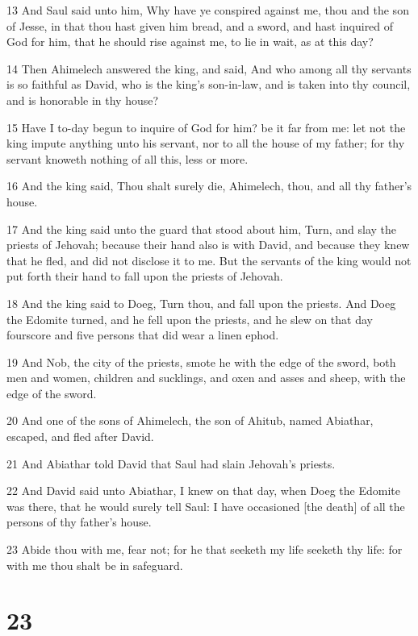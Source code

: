 \par 13 And Saul said unto him, Why have ye conspired against me, thou and the son of Jesse, in that thou hast given him bread, and a sword, and hast inquired of God for him, that he should rise against me, to lie in wait, as at this day?
\par 14 Then Ahimelech answered the king, and said, And who among all thy servants is so faithful as David, who is the king's son-in-law, and is taken into thy council, and is honorable in thy house?
\par 15 Have I to-day begun to inquire of God for him? be it far from me: let not the king impute anything unto his servant, nor to all the house of my father; for thy servant knoweth nothing of all this, less or more.
\par 16 And the king said, Thou shalt surely die, Ahimelech, thou, and all thy father's house.
\par 17 And the king said unto the guard that stood about him, Turn, and slay the priests of Jehovah; because their hand also is with David, and because they knew that he fled, and did not disclose it to me. But the servants of the king would not put forth their hand to fall upon the priests of Jehovah.
\par 18 And the king said to Doeg, Turn thou, and fall upon the priests. And Doeg the Edomite turned, and he fell upon the priests, and he slew on that day fourscore and five persons that did wear a linen ephod.
\par 19 And Nob, the city of the priests, smote he with the edge of the sword, both men and women, children and sucklings, and oxen and asses and sheep, with the edge of the sword.
\par 20 And one of the sons of Ahimelech, the son of Ahitub, named Abiathar, escaped, and fled after David.
\par 21 And Abiathar told David that Saul had slain Jehovah's priests.
\par 22 And David said unto Abiathar, I knew on that day, when Doeg the Edomite was there, that he would surely tell Saul: I have occasioned [the death] of all the persons of thy father's house.
\par 23 Abide thou with me, fear not; for he that seeketh my life seeketh thy life: for with me thou shalt be in safeguard.

\chapter{23}

